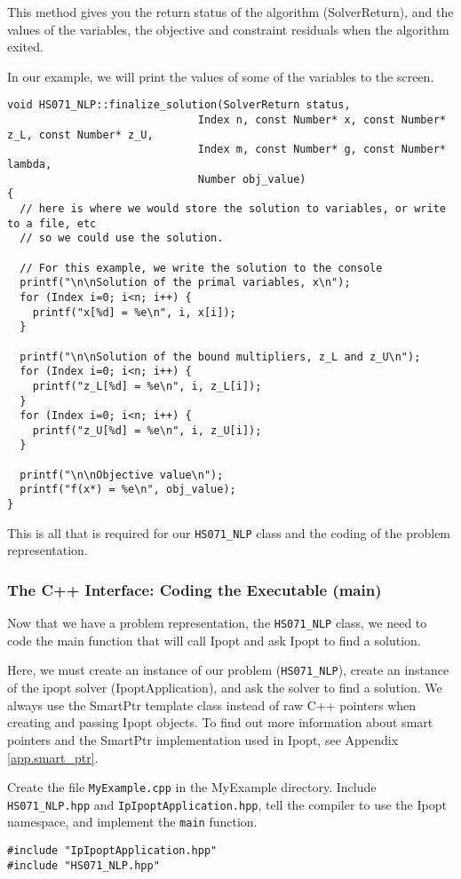 \documentclass[letter,10pt]{article}
\begin{document}
{This method gives you the return status of the algorithm
(SolverReturn), and the values of the variables, 
the objective and constraint residuals when the algorithm exited.

In our example, we will print the values of some of the variables to 
the screen.

\begin{verbatim}
void HS071_NLP::finalize_solution(SolverReturn status,
                              Index n, const Number* x, const Number* z_L, const Number* z_U,
                              Index m, const Number* g, const Number* lambda,
                              Number obj_value)
{
  // here is where we would store the solution to variables, or write to a file, etc
  // so we could use the solution. 

  // For this example, we write the solution to the console
  printf("\n\nSolution of the primal variables, x\n");
  for (Index i=0; i<n; i++) {
    printf("x[%d] = %e\n", i, x[i]); 
  }

  printf("\n\nSolution of the bound multipliers, z_L and z_U\n");
  for (Index i=0; i<n; i++) {
    printf("z_L[%d] = %e\n", i, z_L[i]); 
  }
  for (Index i=0; i<n; i++) {
    printf("z_U[%d] = %e\n", i, z_U[i]); 
  }

  printf("\n\nObjective value\n");
  printf("f(x*) = %e\n", obj_value); 
}
\end{verbatim}

This is all that is required for our {\tt HS071\_NLP} class and 
the coding of the problem representation.
 
\subsubsection{The C++ Interface: Coding the Executable (main)}
Now that we have a problem representation, the {\tt HS071\_NLP} class,
we need to code the main function that will call Ipopt and ask Ipopt
to find a solution.

Here, we must create an instance of our problem ({\tt HS071\_NLP}), create an
instance of the ipopt solver (IpoptApplication), and ask the solver to
find a solution. We always use the SmartPtr template class instead of
raw C++ pointers when creating and passing Ipopt objects. To find out
more information about smart pointers and the SmartPtr implementation
used in Ipopt, see Appendix \ref{app.smart_ptr}.

Create the file {\tt MyExample.cpp} in the MyExample directory.
Include {\tt HS071\_NLP.hpp} and {\tt IpIpoptApplication.hpp}, tell
the compiler to use the Ipopt namespace, and implement the {\tt main}
function.
\begin{verbatim}
#include "IpIpoptApplication.hpp"
#include "HS071_NLP.hpp"


\end{verbatim}}
\end{document}
